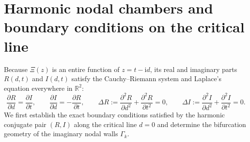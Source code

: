 \documentclass[11pt,a4paper,reqno]{amsart}
\theoremstyle{definition}
\theoremstyle{remark}
\numberwithin{equation}{section}
\newcommand{\ii}{\mathrm{i}}
\begin{document}
\section{Harmonic nodal chambers and boundary conditions on the critical line}\label{sec:chambers}

Because $\Xi(z)$ is an entire function of $z = t - \ii d$, its real and imaginary parts $R(d,t)$ and $I(d,t)$ satisfy the Cauchy--Riemann system and Laplace's equation everywhere in $\mathbb{R}^2$:
\begin{equation}\label{eq:cr_laplace}
\frac{\partial R}{\partial d} = \frac{\partial I}{\partial t}, \qquad \frac{\partial I}{\partial d} = -\frac{\partial R}{\partial t}, \qquad \Delta R := \frac{\partial^2 R}{\partial d^2} + \frac{\partial^2 R}{\partial t^2} = 0, \qquad \Delta I := \frac{\partial^2 I}{\partial d^2} + \frac{\partial^2 I}{\partial t^2} = 0.
\end{equation}
We first establish the exact boundary conditions satisfied by the harmonic conjugate pair $(R,I)$ along the critical line $d = 0$ and determine the bifurcation geometry of the imaginary nodal walls $\Gamma_k$.
\end{document}
